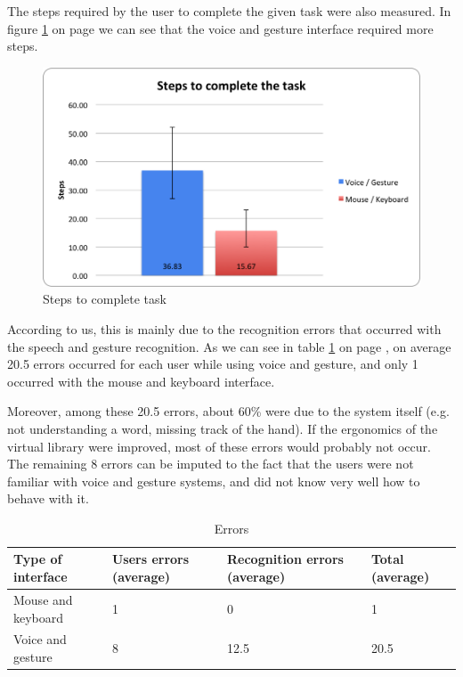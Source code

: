 \documentclass[a4paper, 10pt]{article}
\begin{document}
	\par{The steps required by the user to complete the given task were also measured. In figure \ref{fig:steptask} on page \pageref{fig:steptask} we can see that the voice and gesture interface required more steps. }
	
	\begin{figure}[h]
		\centering
			\includegraphics[scale=0.6]{graphs/steps_to_complete_task.png}
		\caption{Steps to complete task}
		\label{fig:steptask}
	\end{figure}
	
	\par{According to us, this is mainly due to the recognition errors that occurred with the speech and gesture recognition. As we can see in table \ref{tab:errors} on page \pageref{tab:errors}, on average 20.5 errors occurred for each user while using voice and gesture, and only 1 occurred with the mouse and keyboard interface.}
	\par{Moreover, among these 20.5 errors, about 60\% were due to the system itself (e.g. not understanding a word, missing track of the hand). If the ergonomics of the virtual library were improved, most of these errors would probably not occur. The remaining 8 errors can be imputed to the fact that the users were not familiar with voice and gesture systems, and did not know very well how to behave with it.}
	
	\begin{table}
	\centering
		\begin{tabular}{| l | p{2.4cm} | p{2.4cm} | p{2.4cm} |}
			\hline
			\textbf{Type of interface} & Users errors (average) & Recognition errors (average) & Total (average)\\
			\hline
			Mouse and keyboard & 1 & 0 & 1 \\
			\hline
			Voice and gesture & 8 & 12.5 & 20.5 \\
			\hline
		\end{tabular}
		\caption{Errors}
		\label{tab:errors}
	\end{table}
	
\end{document}
